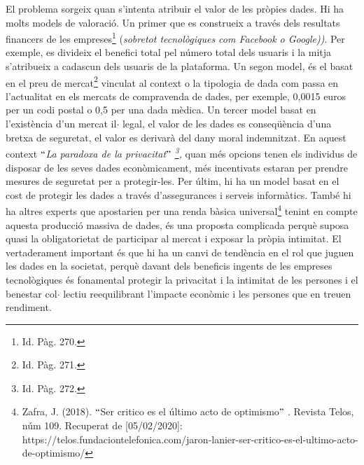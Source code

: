 \documentclass[12pt]{article}
\begin{document}
\vspace{\baselineskip}
\begin{justify}
El problema sorgeix quan s’intenta atribuir el valor de les pròpies dades. Hi ha molts models de valoració. Un primer que es construeix a través dels resultats financers de les empreses\footnote{ Id. Pàg. 270. } (\textit{sobretot tecnològiques com Facebook o Google))}. Per exemple,  es divideix el benefici total pel número total dels usuaris i la mitja s’atribueix a cadascun dels usuaris de la plataforma. Un segon model, és el basat en el preu de mercat\footnote{ Id. Pàg. 271. } vinculat al context o la tipologia de dada com passa en l’actualitat en els mercats de compravenda de dades, per exemple, 0,0015 euros per un codi postal o 0,5 per una dada mèdica. Un tercer model basat en l’existència d’un mercat il$ \cdot $ legal, el valor de les dades es conseqüència d’una bretxa de seguretat, el valor es derivarà del dany moral indemnitzat. En aquest context \textit{$``$La paradoxa de la privacitat$"$ \footnote{ Id. Pàg. 272. }, }quan més opcions tenen els individus de disposar de les seves dades econòmicament, més incentivats estaran per prendre mesures de seguretat per a protegir-les. Per últim, hi ha un model basat en el cost de protegir les dades a través d’assegurances i serveis informàtics. També hi ha altres experts que apostarien per una renda bàsica universal\footnote{ Zafra, J. (2018). $``$Ser critico es el último acto de optimismo$"$ . Revista Telos, núm 109. Recuperat de [05/02/2020]: https://telos.fundaciontelefonica.com/jaron-lanier-ser-critico-es-el-ultimo-acto-de-optimismo/ } tenint en compte aquesta producció massiva de dades, és una proposta complicada perquè suposa quasi la obligatorietat de participar al mercat i exposar la pròpia intimitat.  El vertaderament important és que hi ha un canvi de tendència en el rol que juguen les dades en la societat, perquè davant dels beneficis ingents de les empreses tecnològiques és fonamental protegir la privacitat i la intimitat de les persones i el benestar col$ \cdot $ lectiu reequilibrant l’impacte econòmic i les persones que en treuen rendiment. 
\end{justify}\par
\end{document}
